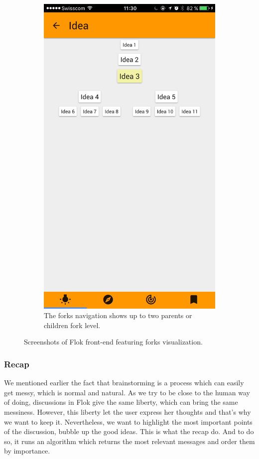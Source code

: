 \documentclass[a4paper,12pt, oneside]{article}
\begin{document}
\begin{figure}[!htb]
\begin{subfigure}[t]{.32\textwidth}
        \includegraphics[width=\textwidth]{images/forks_navigation.png}
        \caption{The forks navigation shows up to two parents or children fork level.}
    \end{subfigure}
    \caption{Screenshots of Flok front-end featuring forks visualization.}
    \label{fig.forks}
\end{figure}

\subsubsection{Recap}
\label{sec.recap}
We mentioned earlier the fact that brainstorming is a process which can easily get messy, which is normal and natural.
As we try to be close to the human way of doing, discussions in Flok give the same liberty, which can bring the same messiness.
However, this liberty let the user express her thoughts and that's why we want to keep it.
Nevertheless, we want to highlight the most important points of the discussion, bubble up the good ideas.
This is what the recap do.
And to do so, it runs an algorithm which returns the most relevant messages and order them by importance.
\end{document}
